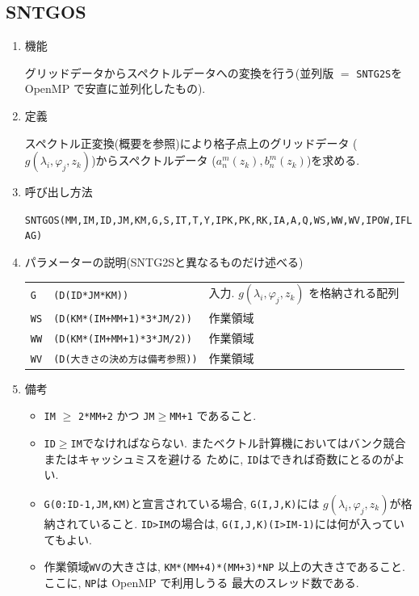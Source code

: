 \documentclass[a4j,fleqn]{jarticle}
\begin{document}

\subsection{SNTGOS}

\begin{enumerate}

\item 機能

グリッドデータからスペクトルデータへの変換を行う(並列版 $=$
{\tt SNTG2S}をOpenMP で安直に並列化したもの).

\item 定義

スペクトル正変換(概要を参照)により格子点上のグリッドデータ
($g(\lambda_i,\varphi_j,z_k)$)からスペクトルデータ
($a^m_n(z_k),b^m_n(z_k)$)を求める.

\item 呼び出し方法 

{\tt SNTGOS(MM,IM,ID,JM,KM,G,S,IT,T,Y,IPK,PK,RK,IA,A,Q,WS,WW,WV,IPOW,IFLAG)}
  
\item パラメーターの説明(SNTG2Sと異なるものだけ述べる)

\begin{tabular}{lll}
{\tt G} & {\tt (D(ID*JM*KM))} & 入力. $g(\lambda_i,\varphi_j,z_k)$
	を格納される配列\\
{\tt WS}  & {\tt (D(KM*(IM+MM+1)*3*JM/2))} & 作業領域\\
{\tt WW}  & {\tt (D(KM*(IM+MM+1)*3*JM/2))} & 作業領域\\
{\tt WV}  & {\tt (D(大きさの決め方は備考参照))} & 作業領域
\end{tabular}

\item 備考

\begin{itemize}

\item {\tt IM} $\ge$ {\tt 2*MM+2} かつ {\tt JM}$\ge${\tt MM+1}
    であること.

\item {\tt ID}$\ge${\tt IM}でなければならない.
   またベクトル計算機においてはバンク競合またはキャッシュミスを避ける
   ために, {\tt ID}はできれば奇数にとるのがよい.

\item {\tt G(0:ID-1,JM,KM)}と宣言されている場合, {\tt G(I,J,K)}には
    $g(\lambda_i,\varphi_j,z_k)$が格納されていること.
    {\tt ID>IM}の場合は, {\tt G(I,J,K)(I>IM-1)}には何が入っていてもよい.

\item 作業領域{\tt WV}の大きさは, 
     {\tt KM*(MM+4)*(MM+3)*NP}
    以上の大きさであること. ここに, {\tt NP}は OpenMP で利用しうる
    最大のスレッド数である.

\end{itemize}

\end{enumerate}
\end{document}
